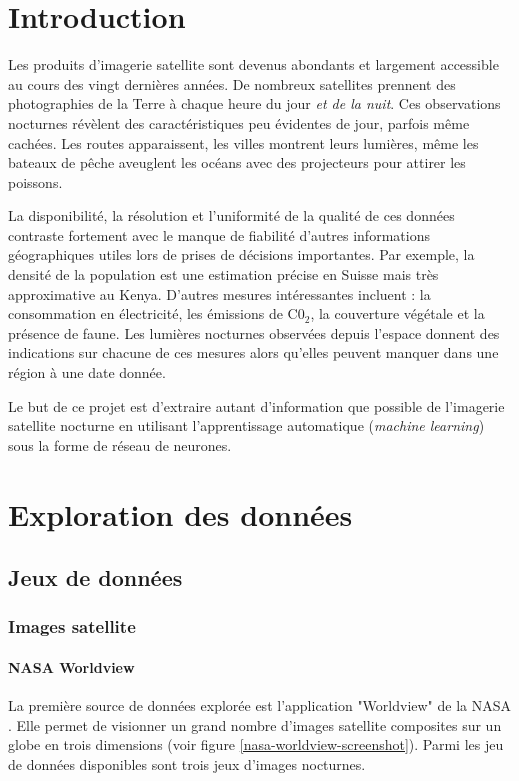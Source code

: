 \documentclass[a4paper, 11pt]{report}
\begin{document}
\chapter{Introduction}
Les produits d'imagerie satellite sont devenus abondants et largement accessible au cours des vingt dernières années. De nombreux satellites prennent des photographies de la Terre à chaque heure du jour \textit{et de la nuit}. Ces observations nocturnes révèlent des caractéristiques peu évidentes de jour, parfois même cachées. Les routes apparaissent, les villes montrent leurs lumières, même les bateaux de pêche aveuglent les océans avec des projecteurs pour attirer les poissons.

La disponibilité, la résolution et l'uniformité de la qualité de ces données contraste fortement avec le manque de fiabilité d'autres informations géographiques utiles lors de prises de décisions importantes. Par exemple, la densité de la population est une estimation précise en Suisse mais très approximative au Kenya. D'autres mesures intéressantes incluent : la consommation en électricité, les émissions de C0$_2$, la couverture végétale et la présence de faune. Les lumières nocturnes observées depuis l'espace donnent des indications sur chacune de ces mesures alors qu'elles peuvent manquer dans une région à une date donnée.

Le but de ce projet est d'extraire autant d'information que possible de l'imagerie satellite nocturne en utilisant l'apprentissage automatique (\textit{machine learning}) sous la forme de réseau de neurones.

\chapter{Exploration des données}
\section{Jeux de données}
\subsection{Images satellite}
\subsubsection{NASA Worldview}
La première source de données explorée est l'application "Worldview" de la NASA \cite{nasa-worldview}. Elle permet de visionner un grand nombre d'images satellite composites sur un globe en trois dimensions (voir figure \ref{nasa-worldview-screenshot}). Parmi les jeu de données disponibles sont trois jeux d'images nocturnes.
\end{document}
